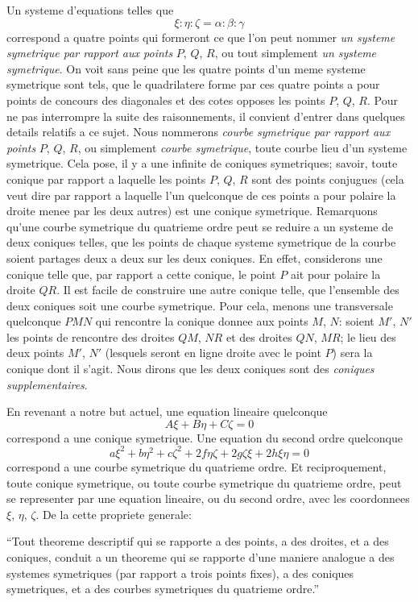 \documentclass[11pt,a4paper]{book}
\begin{document}
Un systeme d'equations telles que
\[
\xi : \eta : \zeta = \alpha : \beta : \gamma
\]
correspond a quatre points qui formeront ce que l'on peut nommer \textit{un systeme symetrique par rapport aux points} $P$, $Q$, $R$, ou tout simplement \textit{un systeme symetrique}. On voit sans peine que les quatre points d'un meme systeme symetrique sont tels, que le quadrilatere forme par ces quatre points a pour points de concours des diagonales et des cotes opposes les points $P$, $Q$, $R$. Pour ne pas interrompre la suite des raisonnements, il convient d'entrer dans quelques details relatifs a ce sujet. Nous nommerons \textit{courbe symetrique par rapport aux points} $P$, $Q$, $R$, ou simplement \textit{courbe symetrique}, toute courbe lieu d'un systeme symetrique. Cela pose, il y a une infinite de coniques symetriques; savoir, toute conique par rapport a laquelle les points $P$, $Q$, $R$ sont des points conjugues (cela veut dire par rapport a laquelle l'un quelconque de ces points a pour polaire la droite menee par les deux autres) est une conique symetrique. Remarquons qu'une courbe symetrique du quatrieme ordre peut se reduire a un systeme de deux coniques telles, que les points de chaque systeme symetrique de la courbe soient partages deux a deux sur les deux coniques. En effet, considerons une conique telle que, par rapport a cette conique, le point $P$ ait pour polaire la droite $QR$. Il est facile de construire une autre conique telle, que l'ensemble des deux coniques soit une courbe symetrique. Pour cela, menons une transversale quelconque $PMN$ qui rencontre la conique donnee aux points $M$, $N$: soient $M'$, $N'$ les points de rencontre des droites $QM$, $NR$ et des droites $QN$, $MR$; le lieu des deux points $M'$, $N'$ (lesquels seront en ligne droite avec le point $P$) sera la conique dont il s'agit. Nous dirons que les deux coniques sont des \textit{coniques supplementaires}.

En revenant a notre but actuel, une equation lineaire quelconque
\[
A\xi + B\eta + C\zeta = 0
\]
correspond a une conique symetrique. Une equation du second ordre quelconque
\[
a\xi^2 + b\eta^2 + c\zeta^2 + 2f\eta\zeta + 2g\zeta\xi + 2h\xi\eta = 0
\]
correspond a une courbe symetrique du quatrieme ordre. Et reciproquement, toute conique symetrique, ou toute courbe symetrique du quatrieme ordre, peut se representer par une equation lineaire, ou du second ordre, avec les coordonnees $\xi$, $\eta$, $\zeta$. De la cette propriete generale:

``Tout theoreme descriptif qui se rapporte a des points, a des droites, et a des coniques, conduit a un theoreme qui se rapporte d'une maniere analogue a des systemes symetriques (par rapport a trois points fixes), a des coniques symetriques, et a des courbes symetriques du quatrieme ordre.''
\end{document}
